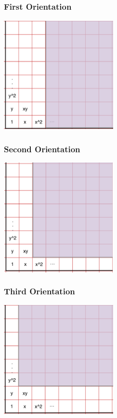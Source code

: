 \documentclass{beamer}
\begin{document}
\begin{frame}
	\frametitle{First Orientation}
	\begin{center}
	\includegraphics[width=6cm, height=6cm]{LogMMidtermPresentationImages/hpis3firstorientation.png}
	\end{center}
\end{frame}

\begin{frame}
	\frametitle{Second Orientation}
	\begin{center}
		\includegraphics[width=6cm, height=6cm]{LogMMidtermPresentationImages/hpis3secondorientation.png}
	\end{center}
\end{frame}

\begin{frame}
	\frametitle{Third Orientation}
	\begin{center}
	\includegraphics[width=6cm, height=6cm]{LogMMidtermPresentationImages/hpis3thirdorientation.png}
	\end{center}
\end{frame}
\end{document}
